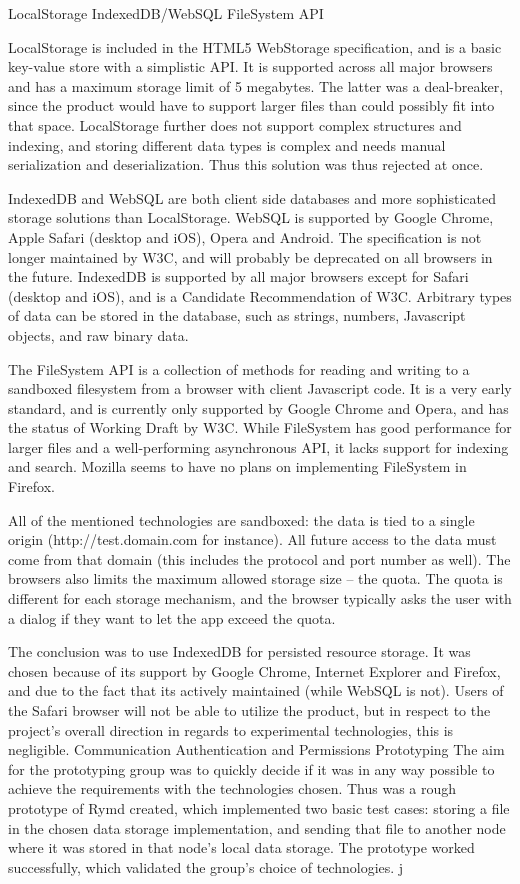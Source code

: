 LocalStorage
IndexedDB/WebSQL
FileSystem API

LocalStorage is included in the HTML5 WebStorage specification, and is a basic key-value store with a simplistic API. It is supported across all major browsers and has a maximum storage limit of 5 megabytes. The latter was a deal-breaker, since the product would have to support larger files than could possibly fit into that space. LocalStorage further does not support complex structures and indexing, and storing different data types is complex and needs manual serialization and deserialization. Thus this solution was thus rejected at once.

IndexedDB and WebSQL are both client side databases and more sophisticated storage solutions than LocalStorage. WebSQL is supported by Google Chrome, Apple Safari (desktop and iOS), Opera and Android. The specification is not longer maintained by W3C, and will probably be deprecated on all browsers in the future. IndexedDB is supported by all major browsers except for Safari (desktop and iOS), and is a Candidate Recommendation of W3C. Arbitrary types of data can be stored in the database, such as strings, numbers, Javascript objects, and raw binary data. 

The FileSystem API is a collection of methods for reading and writing to a sandboxed filesystem from a browser with client Javascript code. It is a very early standard, and is currently only supported by Google Chrome and Opera, and has the status of Working Draft by W3C. While FileSystem has good performance for larger files and a well-performing asynchronous API, it lacks support for indexing and search. Mozilla seems to have no plans on implementing FileSystem in Firefox.

All of the mentioned technologies are sandboxed: the data is tied to a single origin (http://test.domain.com for instance). All future access to the data must come from that domain (this includes the protocol and port number as well). The browsers also limits the maximum allowed storage size – the quota. The quota is different for each storage mechanism, and the browser typically asks the user with a dialog if they want to let the app exceed the quota. 

The conclusion was to use IndexedDB for persisted resource storage. It was chosen because of its support by Google Chrome, Internet Explorer and Firefox, and due to the fact that its actively maintained (while WebSQL is not). Users of the Safari browser will not be able to utilize the product, but in respect to the project's overall direction in regards to experimental technologies, this is negligible. 
Communication
Authentication and Permissions
Prototyping
The aim for the prototyping group was to quickly decide if it was in any way possible to achieve the requirements with the technologies chosen. Thus was a rough prototype of Rymd created, which implemented two basic test cases: storing a file in the chosen data storage implementation, and sending that file to another node where it was stored in that node's local data storage. The prototype worked successfully, which validated the group's choice of technologies.
j
